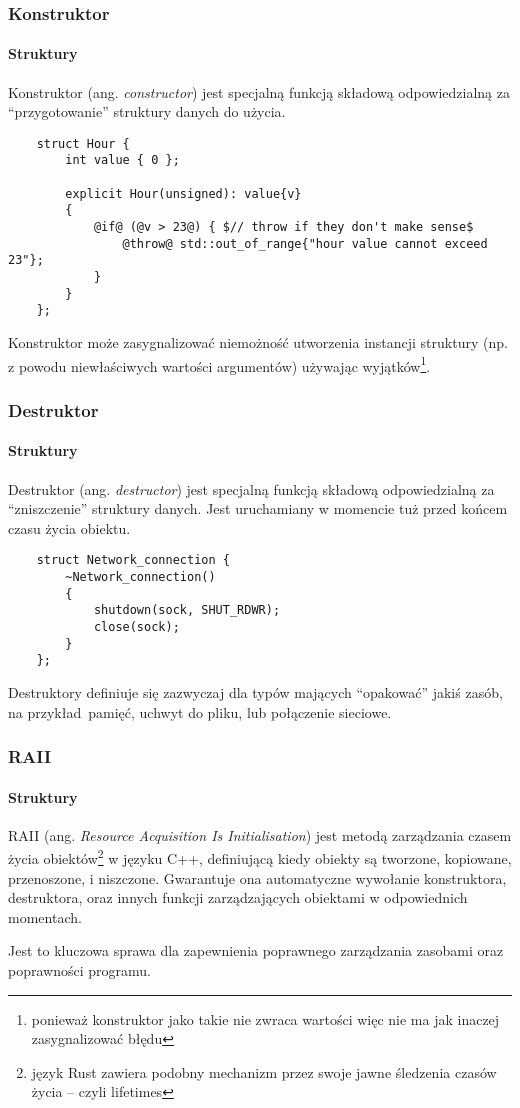 \documentclass[aspectratio=169,10pt]{beamer}
\begin{document}
\begin{frame}[fragile]
    \frametitle{Konstruktor}
    \framesubtitle{Struktury}
    \label{ctor_example}

    Konstruktor (ang. \textit{constructor}) jest specjalną funkcją składową
    odpowiedzialną za ``przygotowanie'' struktury danych do użycia.

    {\scriptsize
    \begin{lstlisting}
    struct Hour {
        int value { 0 };

        explicit Hour(unsigned): value{v}
        {
            @if@ (@v > 23@) { $// throw if they don't make sense$
                @throw@ std::out_of_range{"hour value cannot exceed 23"};
            }
        }
    };
    \end{lstlisting}}

    Konstruktor może zasygnalizować niemożność utworzenia instancji struktury
    (np. z powodu niewłaściwych wartości argumentów) używając
    wyjątków\footnote{ponieważ konstruktor jako takie nie zwraca wartości więc
    nie ma jak inaczej zasygnalizować błędu}.
\end{frame}

\begin{frame}[fragile]
    \frametitle{Destruktor}
    \framesubtitle{Struktury}

    Destruktor (ang. \textit{destructor}) jest specjalną funkcją składową
    odpowiedzialną za ``zniszczenie'' struktury danych. Jest uruchamiany w
    momencie tuż przed końcem czasu życia obiektu.

    {\scriptsize
    \begin{lstlisting}
    struct Network_connection {
        ~Network_connection()
        {
            shutdown(sock, SHUT_RDWR);
            close(sock);
        }
    };
    \end{lstlisting}}

    Destruktory definiuje się zazwyczaj dla typów mających ``opakować'' jakiś
    zasób, na przykład~pamięć, uchwyt do pliku, lub połączenie sieciowe.
\end{frame}

\begin{frame}
    \frametitle{RAII}
    \framesubtitle{Struktury}

    RAII (ang. \emph{Resource Acquisition Is Initialisation}) jest metodą
    zarządzania czasem życia obiektów\footnote{język Rust zawiera podobny
    mechanizm przez swoje jawne śledzenia czasów życia -- czyli lifetimes} w
    języku C++, definiującą kiedy obiekty są tworzone, kopiowane, przenoszone,
    i niszczone. Gwarantuje ona automatyczne wywołanie konstruktora,
    destruktora, oraz innych funkcji zarządzających obiektami w odpowiednich
    momentach.

    \vspace{1em}

    Jest to kluczowa sprawa dla zapewnienia poprawnego zarządzania zasobami oraz
    poprawności programu.
\end{frame}
\end{document}
